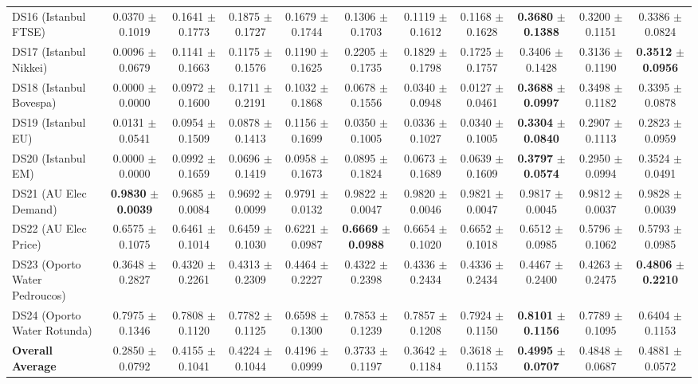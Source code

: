 \begin{table}[t]
{{\begin{tabular}{lcccccccccc}
DS16 (Istanbul FTSE) & 0.0370 $\pm$ 0.1019 & 0.1641 $\pm$ 0.1773 & 0.1875 $\pm$ 0.1727 & 0.1679 $\pm$ 0.1744 & 0.1306 $\pm$ 0.1703 & 0.1119 $\pm$ 0.1612 & 0.1168 $\pm$ 0.1628 & \textbf{0.3680} $\pm$ \textbf{0.1388} & 0.3200 $\pm$ 0.1151 & 0.3386 $\pm$ 0.0824 \\
DS17 (Istanbul Nikkei) & 0.0096 $\pm$ 0.0679 & 0.1141 $\pm$ 0.1663 & 0.1175 $\pm$ 0.1576 & 0.1190 $\pm$ 0.1625 & 0.2205 $\pm$ 0.1735 & 0.1829 $\pm$ 0.1798 & 0.1725 $\pm$ 0.1757 & 0.3406 $\pm$ 0.1428 & 0.3136 $\pm$ 0.1190 & \textbf{0.3512} $\pm$ \textbf{0.0956} \\
DS18 (Istanbul Bovespa) & 0.0000 $\pm$ 0.0000 & 0.0972 $\pm$ 0.1600 & 0.1711 $\pm$ 0.2191 & 0.1032 $\pm$ 0.1868 & 0.0678 $\pm$ 0.1556 & 0.0340 $\pm$ 0.0948 & 0.0127 $\pm$ 0.0461 & \textbf{0.3688} $\pm$ \textbf{0.0997} & 0.3498 $\pm$ 0.1182 & 0.3395 $\pm$ 0.0878 \\
DS19 (Istanbul EU) & 0.0131 $\pm$ 0.0541 & 0.0954 $\pm$ 0.1509 & 0.0878 $\pm$ 0.1413 & 0.1156 $\pm$ 0.1699 & 0.0350 $\pm$ 0.1005 & 0.0336 $\pm$ 0.1027 & 0.0340 $\pm$ 0.1005 & \textbf{0.3304} $\pm$ \textbf{0.0840} & 0.2907 $\pm$ 0.1113 & 0.2823 $\pm$ 0.0959 \\
DS20 (Istanbul EM) & 0.0000 $\pm$ 0.0000 & 0.0992 $\pm$ 0.1659 & 0.0696 $\pm$ 0.1419 & 0.0958 $\pm$ 0.1673 & 0.0895 $\pm$ 0.1824 & 0.0673 $\pm$ 0.1689 & 0.0639 $\pm$ 0.1609 & \textbf{0.3797} $\pm$ \textbf{0.0574} & 0.2950 $\pm$ 0.0994 & 0.3524 $\pm$ 0.0491 \\
DS21 (AU Elec Demand) & \textbf{0.9830} $\pm$ \textbf{0.0039} & 0.9685 $\pm$ 0.0084 & 0.9692 $\pm$ 0.0099 & 0.9791 $\pm$ 0.0132 & 0.9822 $\pm$ 0.0047 & 0.9820 $\pm$ 0.0046 & 0.9821 $\pm$ 0.0047 & 0.9817 $\pm$ 0.0045 & 0.9812 $\pm$ 0.0037 & 0.9828 $\pm$ 0.0039 \\
DS22 (AU Elec Price) & 0.6575 $\pm$ 0.1075 & 0.6461 $\pm$ 0.1014 & 0.6459 $\pm$ 0.1030 & 0.6221 $\pm$ 0.0987 & \textbf{0.6669} $\pm$ \textbf{0.0988} & 0.6654 $\pm$ 0.1020 & 0.6652 $\pm$ 0.1018 & 0.6512 $\pm$ 0.0985 & 0.5796 $\pm$ 0.1062 & 0.5793 $\pm$ 0.0985 \\
DS23 (Oporto Water Pedroucos) & 0.3648 $\pm$ 0.2827 & 0.4320 $\pm$ 0.2261 & 0.4313 $\pm$ 0.2309 & 0.4464 $\pm$ 0.2227 & 0.4322 $\pm$ 0.2398 & 0.4336 $\pm$ 0.2434 & 0.4336 $\pm$ 0.2434 & 0.4467 $\pm$ 0.2400 & 0.4263 $\pm$ 0.2475 & \textbf{0.4806} $\pm$ \textbf{0.2210} \\
DS24 (Oporto Water Rotunda) & 0.7975 $\pm$ 0.1346 & 0.7808 $\pm$ 0.1120 & 0.7782 $\pm$ 0.1125 & 0.6598 $\pm$ 0.1300 & 0.7853 $\pm$ 0.1239 & 0.7857 $\pm$ 0.1208 & 0.7924 $\pm$ 0.1150 & \textbf{0.8101} $\pm$ \textbf{0.1156} & 0.7789 $\pm$ 0.1095 & 0.6404 $\pm$ 0.1153 \\
\midrule
\textbf{Overall Average} & 0.2850 $\pm$ 0.0792 & 0.4155 $\pm$ 0.1041 & 0.4224 $\pm$ 0.1044 & 0.4196 $\pm$ 0.0999 & 0.3733 $\pm$ 0.1197 & 0.3642 $\pm$ 0.1184 & 0.3618 $\pm$ 0.1153 & \textbf{0.4995} $\pm$ \textbf{0.0707} & 0.4848 $\pm$ 0.0687 & 0.4881 $\pm$ 0.0572 \\
\bottomrule
\end{tabular}%
}%
}
\end{table}
